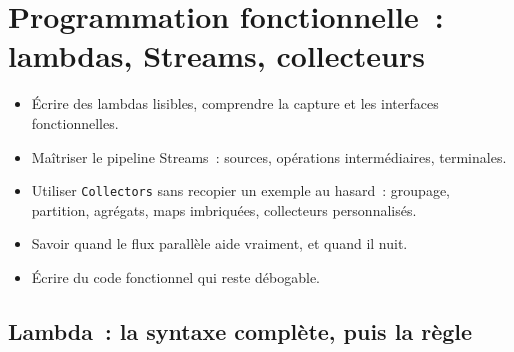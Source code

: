 \documentclass[12pt,a4paper,twoside,openright]{book}
\begin{document}
\chapter{Programmation fonctionnelle~: lambdas, Streams, collecteurs}
\label{ch-java-fonctionnel}

\begin{objectif}
\begin{itemize}
  \item \'Ecrire des lambdas lisibles, comprendre la capture et les interfaces fonctionnelles.
  \item Ma\^itriser le pipeline Streams~: sources, op\'erations interm\'ediaires, terminales.
  \item Utiliser \texttt{Collectors} sans recopier un exemple au hasard~: groupage, partition,
        agr\'egats, maps imbriqu\'ees, collecteurs personnalis\'es.
  \item Savoir quand le flux parall\`ele aide vraiment, et quand il nuit.
  \item \'Ecrire du code fonctionnel qui reste d\'ebogable.
\end{itemize}
\end{objectif}

\section{Lambda~: la syntaxe compl\`ete, puis la r\`egle}
\end{document}
